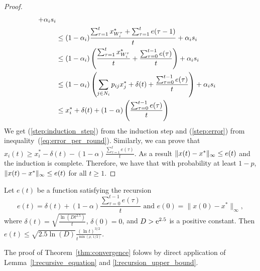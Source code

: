 \begin{proof}
\begin{align}
    + \alpha_i s_i \nonumber \\
    &\leq
    (1-\alpha_i)\frac{\sum_{\tau=1}^{t}x^*_{W_i^{\tau}} +
      \sum_{\tau=1}^{t} e(\tau-1)}{t} + \alpha_i s_i \label{step:induction_step}\\
    &\leq
    (1-\alpha_i)
    \left(
    \frac{\sum_{\tau=1}^{t}x^*_{W_i^{\tau}}}{t}+
    \frac{\sum_{\tau=0}^{t-1} e(\tau)}{t}
    \right)
    + \alpha_i s_i \nonumber\\
    &\leq
    (1-\alpha_i)\left(\sum_{j \in N_i} p_{ij} x^*_{j} +
    \delta(t) + \frac{\sum_{\tau=0}^{t-1} e(\tau)}{t} \right) +
    \alpha_i s_i \label{step:error} \\
    &\leq
    x_i^* + \delta(t) + (1-\alpha)
    \left(
    \frac{\sum_{\tau=0}^{t-1} e(\tau)}{t}
    \right)
    \nonumber
  \end{align}
  We get (\ref{step:induction_step}) from the induction step and
  (\ref{step:error}) from inequality~(\ref{eq:error_per_round}).
  Similarly, we can prove that
  $x_i(t) \geq x_i^* - \delta(t) - (1-\alpha)
  \frac{\sum_{\tau=1}^t e(\tau)}{t}$.
  As a result $\| x(t)-x^* \|_{\infty} \leq e(t)$ and the induction
  is complete.  Therefore, we have that with probability at least $1-p$,
  \(\| x(t) - x^* \|_{\infty} \leq e(t)\) for all $t\geq 1$.
\end{proof}

\begin{lemma}\label{l:recursion_upper_bound}
  Let $e(t)$ be a function satisfying the recursion
  \[
    e(t) =
    \delta(t) + (1-\alpha)\frac{\sum_{\tau=0}^{t-1}e(\tau)}{t}
    \text{ and } e(0)=\|x(0) - x^*\|_{\infty},
  \]
  where \(\delta(t) = \sqrt{\frac{\ln(D t^{2.5})}{t}} \), \(\delta(0) = 0 \),
  and $D > \mathrm{e}^{2.5}$ is a positive constant.  Then
  \(
    e(t) \leq
    \sqrt{2.5 \ln(D)} \frac{(\ln t)^{3/2}}{t^{\min(\rho,\, 1/2)}}.
  \)
\end{lemma}
\noindent The proof of Theorem~\ref{thm:convergence} folows by direct
application of Lemma~\ref{l:recursive_equation} and \ref{l:recursion_upper_bound}.
